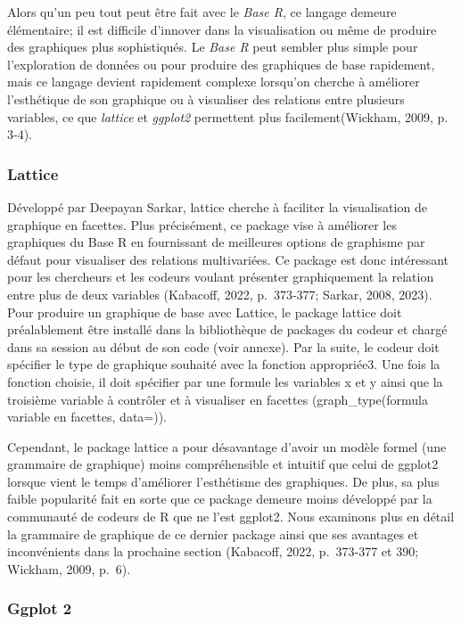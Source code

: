 \documentclass[
  letterpaper,
  DIV=11,
  numbers=noendperiod]{scrreprt}
\begin{document}
Alors qu'un peu tout peut être fait avec le \emph{Base R}, ce langage
demeure élémentaire; il est difficile d'innover dans la visualisation ou
même de produire des graphiques plus sophistiqués. Le \emph{Base R} peut
sembler plus simple pour l'exploration de données ou pour produire des
graphiques de base rapidement, mais ce langage devient rapidement
complexe lorsqu'on cherche à améliorer l'esthétique de son graphique ou
à visualiser des relations entre plusieurs variables, ce que
\emph{lattice} et \emph{ggplot2} permettent plus facilement(Wickham,
2009, p. 3‑4).

\subsubsection{Lattice}\label{lattice}

Développé par Deepayan Sarkar, lattice cherche à faciliter la
visualisation de graphique en facettes. Plus précisément, ce package
vise à améliorer les graphiques du Base R en fournissant de meilleures
options de graphisme par défaut pour visualiser des relations
multivariées. Ce package est donc intéressant pour les chercheurs et les
codeurs voulant présenter graphiquement la relation entre plus de deux
variables (Kabacoff, 2022, p.~373‑377; Sarkar, 2008, 2023). Pour
produire un graphique de base avec Lattice, le package lattice doit
préalablement être installé dans la bibliothèque de packages du codeur
et chargé dans sa session au début de son code (voir annexe). Par la
suite, le codeur doit spécifier le type de graphique souhaité avec la
fonction appropriée3. Une fois la fonction choisie, il doit spécifier
par une formule les variables x et y ainsi que la troisième variable à
contrôler et à visualiser en facettes (graph\_type(formula \textbar{}
variable en facettes, data=)).

Cependant, le package lattice a pour désavantage d'avoir un modèle
formel (une grammaire de graphique) moins compréhensible et intuitif que
celui de ggplot2 lorsque vient le temps d'améliorer l'esthétisme des
graphiques. De plus, sa plus faible popularité fait en sorte que ce
package demeure moins développé par la communauté de codeurs de R que ne
l'est ggplot2. Nous examinons plus en détail la grammaire de graphique
de ce dernier package ainsi que ses avantages et inconvénients dans la
prochaine section (Kabacoff, 2022, p.~373‑377 et 390; Wickham, 2009,
p.~6).

\subsubsection{Ggplot 2}\label{ggplot-2}
\end{document}
